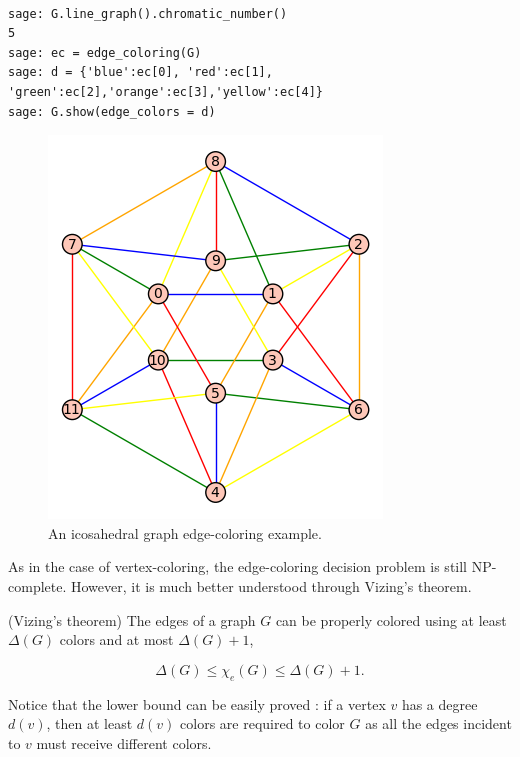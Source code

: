 \begin{example}
\begin{verbatim}
\end{verbatim}


\begin{verbatim}

sage: G.line_graph().chromatic_number()
5
sage: ec = edge_coloring(G)
sage: d = {'blue':ec[0], 'red':ec[1], 'green':ec[2],'orange':ec[3],'yellow':ec[4]}
sage: G.show(edge_colors = d)

\end{verbatim}


\begin{figure}[!htbp]
\centering
{}
\includegraphics[scale=0.7]{image/graph-coloring/icosahedral-graph-edge-coloring-example}
\caption{An icosahedral graph edge-coloring example.}
\label{fig:graph-coloring:icosahedral-graph-edge-coloring-example}
\end{figure}

\end{example}


As in the case of vertex-coloring, the edge-coloring decision problem is 
still NP-complete. However, it is much better understood through 
Vizing's theorem.

\begin{theorem}
(Vizing's theorem)
The edges of a graph $G$ can be properly colored using at least 
$\Delta(G)$ colors and at most $\Delta(G)+1$,

\[
\Delta(G)\leq \chi_e(G)\leq \Delta(G)+1.
\]
\end{theorem}

Notice that the lower bound can be easily proved : if a vertex 
$v$ has a degree $d(v)$, then at least $d(v)$ colors are required 
to color $G$ as all the edges incident to $v$ must receive 
different colors. 

